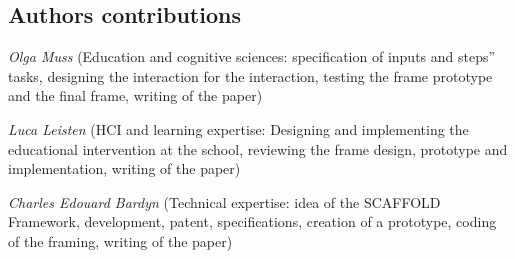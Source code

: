 \documentclass[fleqn,10pt]{wlscirep}
\begin{document}
\subsection*{Authors contributions}

\textit{Olga Muss} (Education and cognitive sciences: specification of inputs and steps'' tasks, designing the interaction for the interaction, testing the frame prototype and the final frame, writing of the paper)

\textit{Luca Leisten} (HCI and learning expertise: Designing and implementing the educational intervention at the school, reviewing the frame design, prototype and implementation, writing of the paper)

\textit{Charles Edouard Bardyn} (Technical expertise: idea of the SCAFFOLD Framework, development, patent, specifications, creation of a prototype, coding of the framing, writing of the paper)
\end{document}
